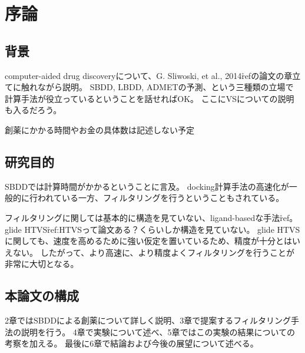 \chapter{序論}
\section{背景}
computer-aided drug discoveryについて、G. Sliwoski, et al., 2014\r{ref}の論文の章立てに触れながら説明。
SBDD, LBDD, ADMETの予測、という三種類の立場で計算手法が役立っているということを話せればOK。
ここにVSについての説明も入るだろう。

創薬にかかる時間やお金の具体数は記述しない予定

\section{研究目的}
SBDDでは計算時間がかかるということに言及。
docking計算手法の高速化が一般的に行われている一方、フィルタリングを行うということもされている。

フィルタリングに関しては基本的に構造を見ていない、ligand-basedな手法\r{ref}。glide HTVS\r{ref:HTVSって論文ある？}くらいしか構造を見ていない。
glide HTVSに関しても、速度を高めるために強い仮定を置いているため、精度が十分とはいえない。
したがって、より高速に、より精度よくフィルタリングを行うことが非常に大切となる。

\section{本論文の構成}
2章ではSBDDによる創薬について詳しく説明、3章で提案するフィルタリング手法の説明を行う。
4章で実験について述べ、5章ではこの実験の結果についての考察を加える。
最後に6章で結論および今後の展望について述べる。